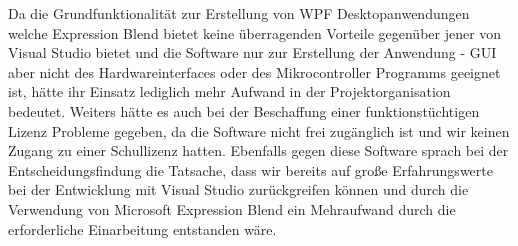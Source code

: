 \begin{itemize}
Da die Grundfunktionalität zur Erstellung von WPF Desktopanwendungen welche Expression Blend bietet keine überragenden Vorteile gegenüber jener von Visual Studio bietet und die Software nur zur Erstellung der Anwendung - GUI aber nicht des Hardwareinterfaces oder des Mikrocontroller Programms geeignet ist, hätte ihr Einsatz lediglich mehr Aufwand in der Projektorganisation bedeutet.
Weiters hätte es auch bei der Beschaffung einer funktionstüchtigen Lizenz Probleme gegeben, da die Software nicht frei zugänglich ist und wir keinen Zugang zu einer Schullizenz hatten.
Ebenfalls gegen diese Software sprach bei der Entscheidungsfindung die Tatsache, dass wir bereits auf große Erfahrungswerte bei der Entwicklung mit Visual Studio zurückgreifen können und durch die Verwendung von Microsoft Expression Blend ein Mehraufwand durch die erforderliche Einarbeitung entstanden wäre.
\end{itemize}

